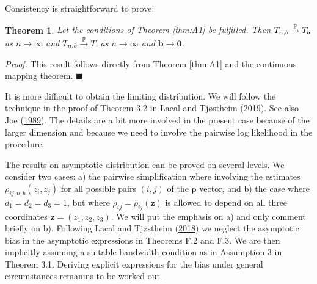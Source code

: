 \documentclass[
  12pt,
  letterpaper]{article}
\newtheorem{thm}{Theorem}[section]
\numberwithin{equation}{section}
\newcommand{\z}{\bm{z}}
\newcommand{\frho}{\bm{\rho}}
\newcommand{\bb}{\bm{b}}
\begin{document}
Consistency is straightforward to prove:

\begin{thm}
Let the conditions of Theorem \ref{thm:A1} be fulfilled. Then $T_{n,b} \buildrel {\mathbb{P}} \over {\to} T_b$ as $n \to \infty$ and $T_{n,b} \buildrel {\mathbb{P}} \over {\to} T$ as $n \to \infty$ and $\bb \to \bm{0}$.
\label{thm:F1}
\end{thm}

\emph{Proof.} This result follows directly from Theorem \ref{thm:A1} and the continuous mapping theorem. \(\blacksquare\)

It is more difficult to obtain the limiting distribution. We will follow the technique in the proof of Theorem 3.2 in Lacal and Tjøstheim (\protect\hyperlink{ref-lacal2018estimating}{2019}). See also Joe (\protect\hyperlink{ref-joe1989estimation}{1989}). The details are a bit more involved in the present case because of the larger dimension and because we need to involve the pairwise log likelihood in the procedure.

The results on asymptotic distribution can be proved on several levels. We consider two cases: a) the pairwise simplification where involving the estimates \(\rho_{ij,n,b}(z_i,z_j)\) for all possible pairs \((i,j)\) of the \(\frho\) vector, and b) the case where \(d_1=d_2=d_3=1\), but where \(\rho_{ij} = \rho_{ij}(\z)\) is allowed to depend on all three coordinates \(\z=(z_1,z_2,z_3)\). We will put the emphasis on a) and only comment briefly on b). Following Lacal and Tjøstheim (\protect\hyperlink{ref-lacal2018estimating}{2018}) we neglect the asymptotic bias in the asymptotic expressions in Theorems F.2 and F.3. We are then implicitly assuming a suitable bandwidth condition as in Assumption 3 in Theorem 3.1. Deriving explicit expressions for the bias under general circumstances remanins to be worked out.
\end{document}
